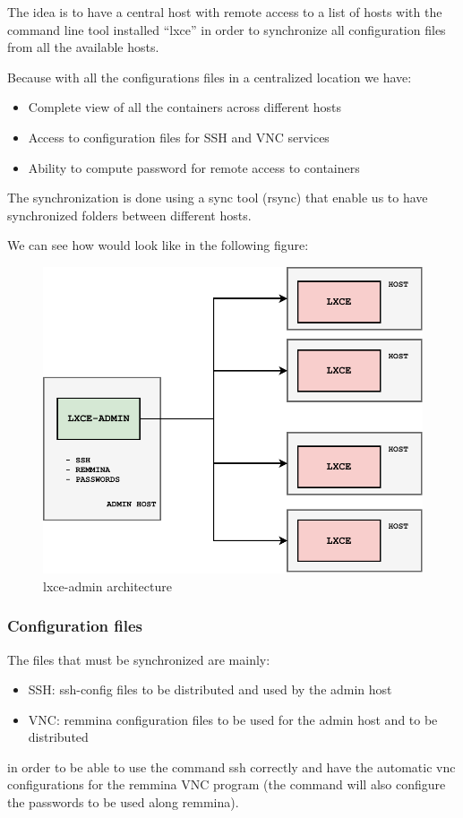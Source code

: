 The idea is to have a central host with remote access to a list of hosts with the command line tool installed ``lxce'' in order to synchronize all configuration files from all the available hosts. 

Because with all the configurations files in a centralized location we have:
\begin{itemize}
	\item{Complete view of all the containers across different hosts}
	\item{Access to configuration files for SSH and VNC services}
	\item{Ability to compute password for remote access to containers}
\end{itemize}

The synchronization is done using a sync tool (rsync\cite{rsync}) that enable us to have synchronized folders between different hosts.

We can see how would look like in the following figure:
\begin{figure}[H]
	\label{fig:lxce-admin architecture}
	\centering
	\includegraphics{img/03/lxce-admin-diagram.pdf}
	\caption[lxce-admin architecture]{\footnotesize{lxce-admin architecture}}
\end{figure}


\subsubsection{Configuration files}
The files that must be synchronized are mainly:
\begin{itemize}
	\item{SSH: ssh-config files to be distributed and used by the admin host}
	\item{VNC: remmina configuration files to be used for the admin host and to be distributed}
\end{itemize}
in order to be able to use the command ssh correctly and have the automatic vnc configurations for the remmina VNC program (the command will also configure the passwords to be used along remmina).


